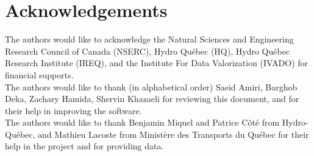 \section*{Acknowledgements}

The authors would like to acknowledge the Natural Sciences and Engineering Research Council of Canada (NSERC), Hydro Qu\'ebec (HQ), Hydro Qu\'ebec Research Institute (IREQ), and the Institute For Data Valorization (IVADO) for financial supports.\\

The authors would like to thank (in alphabetical order) Saeid Amiri, Barghob Deka, Zachary Hamida, Shervin Khazaeli for reviewing this document, and for their help in improving the software.\\

The authors would like to thank Benjamin Miquel and Patrice C\^ot\'e from Hydro-Qu\'ebec, and Mathieu Lacoste from Minist\`ere des Transports du Qu\'ebec  for their help in the project and for providing data.
